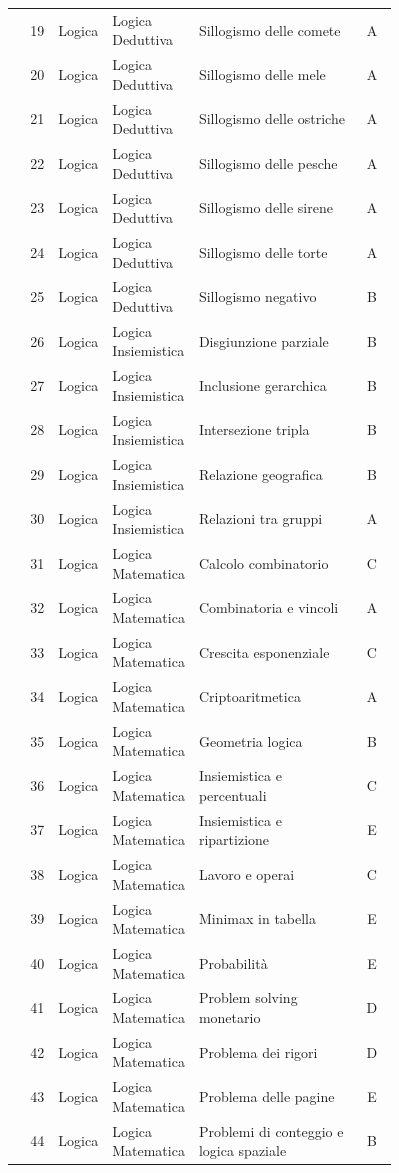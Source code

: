 \documentclass[20pt, a4paper]{article}
\begin{document}
\begin{longtable}{@{}r>{\raggedright\arraybackslash}p{0.14\linewidth}>{\raggedright\arraybackslash}p{0.20\linewidth}>{\raggedright\arraybackslash}p{0.42\linewidth}c@{}}
19 & Logica & Logica Deduttiva & Sillogismo delle comete & A \\
20 & Logica & Logica Deduttiva & Sillogismo delle mele & A \\
21 & Logica & Logica Deduttiva & Sillogismo delle ostriche & A \\
22 & Logica & Logica Deduttiva & Sillogismo delle pesche & A \\
23 & Logica & Logica Deduttiva & Sillogismo delle sirene & A \\
24 & Logica & Logica Deduttiva & Sillogismo delle torte & A \\
25 & Logica & Logica Deduttiva & Sillogismo negativo & B \\
26 & Logica & Logica Insiemistica & Disgiunzione parziale & B \\
27 & Logica & Logica Insiemistica & Inclusione gerarchica & B \\
28 & Logica & Logica Insiemistica & Intersezione tripla & B \\
29 & Logica & Logica Insiemistica & Relazione geografica & B \\
30 & Logica & Logica Insiemistica & Relazioni tra gruppi & A \\
31 & Logica & Logica Matematica & Calcolo combinatorio & C \\
32 & Logica & Logica Matematica & Combinatoria e vincoli & A \\
33 & Logica & Logica Matematica & Crescita esponenziale & C \\
34 & Logica & Logica Matematica & Criptoaritmetica & A \\
35 & Logica & Logica Matematica & Geometria logica & B \\
36 & Logica & Logica Matematica & Insiemistica e percentuali & C \\
37 & Logica & Logica Matematica & Insiemistica e ripartizione & E \\
38 & Logica & Logica Matematica & Lavoro e operai & C \\
39 & Logica & Logica Matematica & Minimax in tabella & E \\
40 & Logica & Logica Matematica & Probabilità & E \\
41 & Logica & Logica Matematica & Problem solving monetario & D \\
42 & Logica & Logica Matematica & Problema dei rigori & D \\
43 & Logica & Logica Matematica & Problema delle pagine & E \\
44 & Logica & Logica Matematica & Problemi di conteggio e logica spaziale & B \\

\end{longtable}
\end{document}

